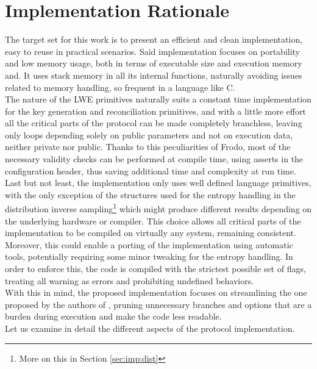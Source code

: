 \section{Implementation Rationale}
The target set for this work is to present an efficient and clean implementation, easy to reuse in practical scenarios. Said implementation focuses on portability and low memory usage, both in terms of executable size and execution memory and. It uses stack memory in all its internal functions, naturally avoiding issues related to memory handling, so frequent in a language like C.\\
The nature of the LWE primitives naturally suits a constant time implementation for the key generation and reconciliation primitives, and with a little more effort all the critical parts of the protocol can be made completely branchless, leaving only loops depending solely on public parameters and not on execution data, neither private nor public. Thanks to this peculiarities of Frodo, most of the necessary validity checks can be performed at compile time, using asserts in the configuration header, thus saving additional time and complexity at run time.\\
Last but not least, the implementation only uses well defined language primitives, with the only exception of the structures used for the entropy handling in the distribution inverse sampling\footnote{More on this in Section \ref{sec:imp:dist}} which might produce different results depending on the underlying hardware or compiler. This choice allows all critical parts of the implementation to be compiled on virtually any system, remaining consistent. Moreover, this could enable a porting of the implementation using automatic tools, potentially requiring some minor tweaking for the entropy handling. In order to enforce this, the code is compiled with the strictest possible set of flags, treating all warning as errors and prohibiting undefined behaviors.\\
With this in mind, the proposed implementation focuses on streamlining the one proposed by the authors of \cite{frodo}, pruning unnecessary branches and options that are a burden during execution and make the code less readable.\\
Let us examine in detail the different aspects of the protocol implementation.

